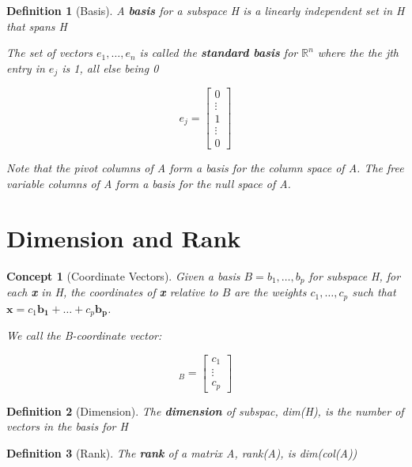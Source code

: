 \documentclass[12pt]{report}
\newtheorem{dfn}{Definition}
\newtheorem{cpt}{Concept}
\begin{document}
\begin{dfn}[Basis]
A \textbf{basis} for a subspace H is a linearly independent set in H that spans H

The set of vectors $e_1,\ldots,e_n$ is called the \textbf{standard basis} for $\mathbb{R}^n$ where the the jth entry in $e_j$ is 1, all else being 0

\begin{equation*}
e_j=
\begin{bmatrix}
0 \\ \vdots \\ 1 \\ \vdots \\0
\end{bmatrix}
\end{equation*}

Note that the pivot columns of A form a basis for the column space of A. The free variable columns of A form a basis for the null space of A.

\end{dfn}

\section{Dimension and Rank}

\begin{cpt}[Coordinate Vectors]

Given a basis $B=b_1,\ldots,b_p$ for subspace H, for each \textbf{x} in H, the coordinates of \textbf{x} relative to $B$ are the weights $c_1,\ldots,c_p$ such that $\bm{x}=c_1\bm{b_1}+\ldots+c_p\bm{b_p}$.

We call the B-coordinate vector:

\begin{equation*}
[x]_B=
\begin{bmatrix}
c_1 \\ \vdots \\ c_p
\end{bmatrix}
\end{equation*}

\end{cpt}

\begin{dfn}[Dimension]
The \textbf{dimension} of subspac, dim(H), is the number of vectors in the basis for H
\end{dfn}

\begin{dfn}[Rank]
The \textbf{rank} of a matrix A, rank(A), is dim(col(A))
\end{dfn}
\end{document}
